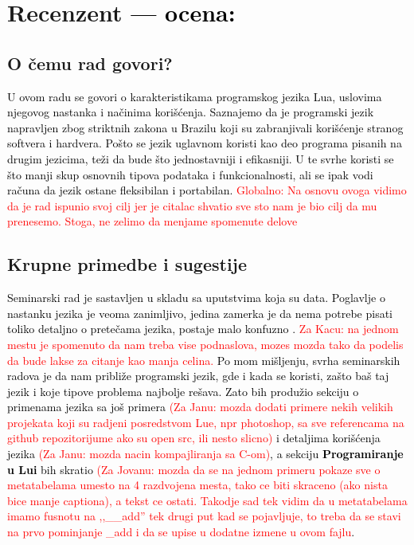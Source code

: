 \documentclass[a4paper]{report}
\newcommand{\odgovor}[1]{\textcolor{black}{#1}}
\newcommand{\note}[1]{\textcolor{red}{#1}}
\begin{document}
\chapter{Recenzent \odgovor{--- ocena:} }


\section{O čemu rad govori?}
\odgovor{
U ovom radu se govori o karakteristikama programskog jezika Lua, uslovima njegovog nastanka i načinima korišćenja. Saznajemo da je programski jezik napravljen zbog striktnih zakona u Brazilu koji su zabranjivali korišćenje stranog softvera i hardvera. Pošto se jezik uglavnom koristi kao deo programa pisanih na drugim jezicima, teži da bude što jednostavniji i efikasniji. U te svrhe koristi se što manji skup osnovnih tipova podataka i funkcionalnosti, ali se ipak vodi računa da jezik ostane fleksibilan i portabilan. 
}
\note{Globalno: Na osnovu ovoga vidimo da je rad ispunio svoj cilj jer je citalac shvatio sve sto nam je bio cilj da mu prenesemo. Stoga, ne zelimo da menjame spomenute delove}

\section{Krupne primedbe i sugestije}
\odgovor{
Seminarski rad je sastavljen u skladu sa uputstvima koja su data. Poglavlje o nastanku jezika je veoma zanimljivo, jedina zamerka je da nema potrebe pisati toliko detaljno o pretečama jezika, postaje malo konfuzno .\newline
\note{Za Kacu: na jednom mestu je spomenuto da nam treba vise podnaslova, mozes mozda tako da podelis da bude lakse za citanje kao manja celina.}
Po mom mišljenju, svrha seminarskih radova je da nam približe programski jezik, gde i kada se koristi, zašto baš taj jezik i koje tipove problema najbolje rešava. Zato bih produžio sekciju o primenama jezika sa još primera \note{(Za Janu: mozda dodati primere nekih velikih projekata koji su radjeni posredstvom Lue, npr photoshop, sa sve referencama na github repozitorijume ako su open src, ili nesto slicno)} i detaljima korišćenja jezika \note{(Za Janu: mozda nacin kompajliranja sa C-om)}, a sekciju 
\textbf{Programiranje u Lui} bih skratio 
\note{(Za Jovanu: mozda da se na jednom primeru pokaze sve o metatabelama umesto na 4 razdvojena mesta, tako ce biti skraceno (ako nista bice manje captiona), a tekst ce ostati. Takodje sad tek vidim da u metatabelama imamo fusnotu na ,,\_\_add'' tek drugi put kad se pojavljuje, to treba da se stavi na prvo pominjanje \_add i da se upise u dodatne izmene u ovom fajlu}.  
}
\end{document}
